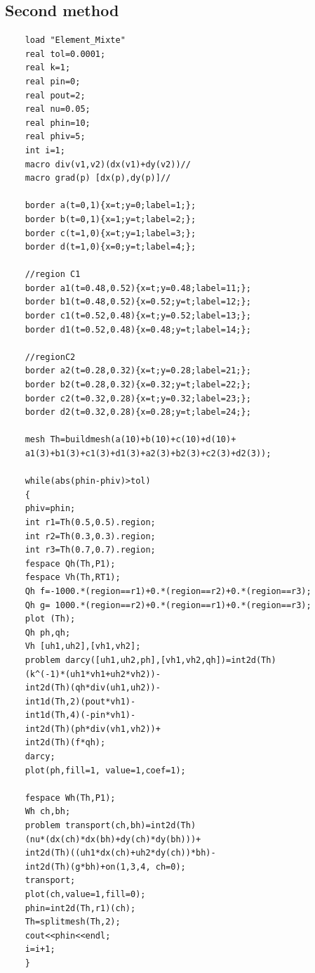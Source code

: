 \documentclass[]{report}
\begin{document}
\subsection{Second method}
\begin{lstlisting}
	load "Element_Mixte"
	real tol=0.0001;
	real k=1;
	real pin=0;
	real pout=2;
	real nu=0.05;
	real phin=10;
	real phiv=5;
	int i=1;
	macro div(v1,v2)(dx(v1)+dy(v2))//
	macro grad(p) [dx(p),dy(p)]//
	
	border a(t=0,1){x=t;y=0;label=1;};
	border b(t=0,1){x=1;y=t;label=2;};
	border c(t=1,0){x=t;y=1;label=3;};
	border d(t=1,0){x=0;y=t;label=4;};
	
	//region C1
	border a1(t=0.48,0.52){x=t;y=0.48;label=11;};
	border b1(t=0.48,0.52){x=0.52;y=t;label=12;};
	border c1(t=0.52,0.48){x=t;y=0.52;label=13;};
	border d1(t=0.52,0.48){x=0.48;y=t;label=14;};
	
	//regionC2
	border a2(t=0.28,0.32){x=t;y=0.28;label=21;};
	border b2(t=0.28,0.32){x=0.32;y=t;label=22;};
	border c2(t=0.32,0.28){x=t;y=0.32;label=23;};
	border d2(t=0.32,0.28){x=0.28;y=t;label=24;};
	
	mesh Th=buildmesh(a(10)+b(10)+c(10)+d(10)+
	a1(3)+b1(3)+c1(3)+d1(3)+a2(3)+b2(3)+c2(3)+d2(3));
	
	while(abs(phin-phiv)>tol)
	{
	phiv=phin;
	int r1=Th(0.5,0.5).region;
	int r2=Th(0.3,0.3).region;
	int r3=Th(0.7,0.7).region;
	fespace Qh(Th,P1);
	fespace Vh(Th,RT1);
	Qh f=-1000.*(region==r1)+0.*(region==r2)+0.*(region==r3);
	Qh g= 1000.*(region==r2)+0.*(region==r1)+0.*(region==r3);
	plot (Th);
	Qh ph,qh;
	Vh [uh1,uh2],[vh1,vh2];
	problem darcy([uh1,uh2,ph],[vh1,vh2,qh])=int2d(Th)
	(k^(-1)*(uh1*vh1+uh2*vh2))-
	int2d(Th)(qh*div(uh1,uh2))-
	int1d(Th,2)(pout*vh1)-
	int1d(Th,4)(-pin*vh1)-
	int2d(Th)(ph*div(vh1,vh2))+
	int2d(Th)(f*qh);
	darcy;
	plot(ph,fill=1, value=1,coef=1);
	
	fespace Wh(Th,P1);
	Wh ch,bh;
	problem transport(ch,bh)=int2d(Th)
	(nu*(dx(ch)*dx(bh)+dy(ch)*dy(bh)))+
	int2d(Th)((uh1*dx(ch)+uh2*dy(ch))*bh)-
	int2d(Th)(g*bh)+on(1,3,4, ch=0);
	transport;
	plot(ch,value=1,fill=0);
	phin=int2d(Th,r1)(ch);
	Th=splitmesh(Th,2);
	cout<<phin<<endl;
	i=i+1;
	}
\end{lstlisting}
\end{document}

